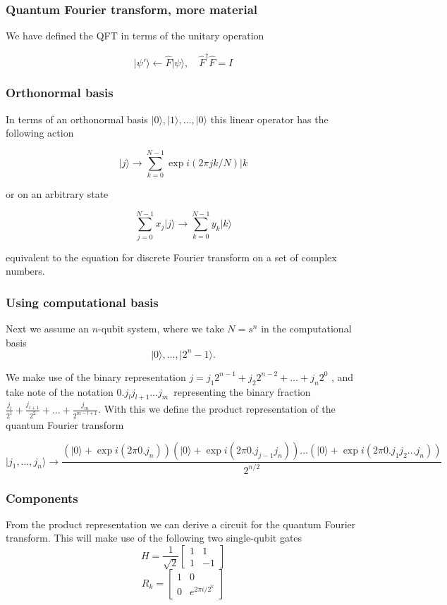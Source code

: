 \documentclass{beamer}
\begin{document}
\begin{frame}
\frametitle{Quantum Fourier transform, more material}

We have defined the QFT in terms of
the unitary operation

\[
    \vert \psi'\rangle \leftarrow \hat{F}\vert \psi\rangle, \quad \hat{F}^\dagger \hat{F} = I
\]
\end{frame}

\begin{frame}
\frametitle{Orthonormal basis}

In terms of an orthonormal basis $\vert 0 \rangle,\vert 1\rangle,\dots,\vert 0 \rangle$ this linear operator has the following action

\[
\vert j \rangle \rightarrow \sum_{k=0}^{N-1} \exp{i(2\pi jk/N)}\vert k 
\]

 or on an arbitrary state

\[
\sum_{j=0}^{N-1} x_j \vert j \rangle \rightarrow \sum_{k=0}^{N-1} y_k\vert k \rangle
\]

equivalent to the equation for discrete Fourier transform on a set of complex numbers.
\end{frame}

\begin{frame}
\frametitle{Using computational basis}

Next we assume an $n$-qubit system, where we take $N=s^n$ in the computational basis 
\[
\vert 0 \rangle,\dots,\vert 2^n -1\rangle.
\]

We make use of the binary representation $j = j_1 2^{n-1} + j_2
2^{n-2} + \dots + j_n 2^0$ , and take note of the notation $0.j_l
j_{l+1} \dots j_m$ representing the binary fraction $\frac{j_l}{2^1} +
\frac{j_{l+1}}{2^{2}} + \dots + \frac{j_m}{2^{m-l+1}}$. With this we
define the product representation of the quantum Fourier transform

\[
\vert j_1,\dots,j_n\rangle  \rightarrow 
\frac{
\left(\vert 0 \rangle + \exp{i(2\pi 0.j_n)}\right)
\left(\vert 0 \rangle + \exp{i(2\pi 0.j_{j-1}j_n)}\right)
\dots
\left(\vert 0 \rangle + \exp{i(2\pi 0.j_1j_2\dots j_n)}\right)
}{2^{n/2}}
\]
\end{frame}

\begin{frame}
\frametitle{Components}

From the product representation we can derive a circuit for the
quantum Fourier transform. This will make use of the following two
single-qubit gates
\[
    H = \frac{1}{\sqrt{2}}
    \begin{bmatrix}
        1 & 1 \\
        1 & -1
    \end{bmatrix}
\]
\[
    R_k =
    \begin{bmatrix}
        1 & 0 \\
        0 & e^{2\pi i/2^{k}}
    \end{bmatrix}
\]
\end{frame}
\end{document}
